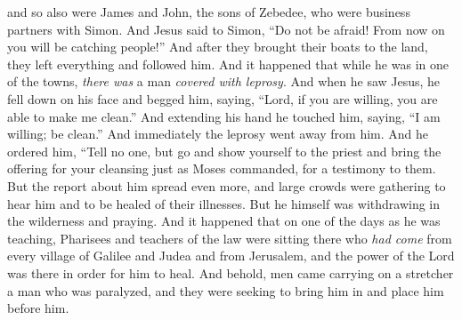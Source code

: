 \begin{biblechapter}
\verse and so also were James and John, the sons of Zebedee, who were business partners with Simon. And Jesus said to Simon, “Do not be afraid! From now on you will be catching people!”
\verse And after they brought their boats to the land, they left everything and followed him.
 And it happened that while he was in one of the towns, \textit{there was} a man \textit{covered with leprosy}. And when he saw Jesus, he fell down on his face and begged him, saying, “Lord, if you are willing, you are able to make me clean.”
\verse And extending his hand he touched him, saying, “I am willing; be clean.” And immediately the leprosy went away from him.
\verse And he ordered him, “Tell no one, but go and show yourself to the priest and bring the offering for your cleansing just as Moses commanded, for a testimony to them.
\verse But the report about him spread even more, and large crowds were gathering to hear him and to be healed of their illnesses.
\verse But he himself was withdrawing in the wilderness and praying.
 And it happened that on one of the days as he was teaching, Pharisees and teachers of the law were sitting there who \textit{had come} from every village of Galilee and Judea and from Jerusalem, and the power of the Lord was there in order for him to heal.
\verse And behold, men came carrying on a stretcher a man who was paralyzed, and they were seeking to bring him in and place him﻿ before him.

\end{biblechapter}
